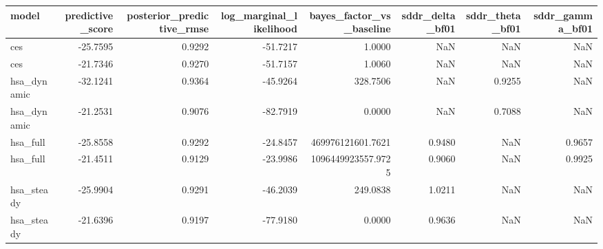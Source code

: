 \begin{tabular}{lrrrrrrr}
\toprule
model & predictive\_score & posterior\_predictive\_rmse & log\_marginal\_likelihood & bayes\_factor\_vs\_baseline & sddr\_delta\_bf01 & sddr\_theta\_bf01 & sddr\_gamma\_bf01 \\
\midrule
ces & -25.7595 & 0.9292 & -51.7217 & 1.0000 & NaN & NaN & NaN \\
ces & -21.7346 & 0.9270 & -51.7157 & 1.0060 & NaN & NaN & NaN \\
hsa\_dynamic & -32.1241 & 0.9364 & -45.9264 & 328.7506 & NaN & 0.9255 & NaN \\
hsa\_dynamic & -21.2531 & 0.9076 & -82.7919 & 0.0000 & NaN & 0.7088 & NaN \\
hsa\_full & -25.8558 & 0.9292 & -24.8457 & 469976121601.7621 & 0.9480 & NaN & 0.9657 \\
hsa\_full & -21.4511 & 0.9129 & -23.9986 & 1096449923557.9725 & 0.9060 & NaN & 0.9925 \\
hsa\_steady & -25.9904 & 0.9291 & -46.2039 & 249.0838 & 1.0211 & NaN & NaN \\
hsa\_steady & -21.6396 & 0.9197 & -77.9180 & 0.0000 & 0.9636 & NaN & NaN \\
\bottomrule
\end{tabular}

